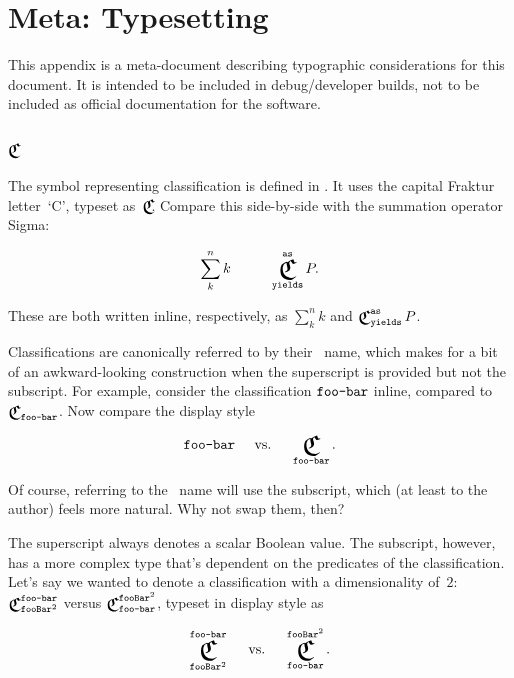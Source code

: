 
\section{Meta: Typesetting}
This appendix is a meta-document describing typographic considerations for
  this document.
It is intended to be included in debug/developer builds,
  not to be included as official documentation for the software.

\subsection{$\Classify$}
The symbol representing classification is defined in .
It uses the capital Fraktur letter~`C',
  typeset as~$\Classify\!\!$.
Compare this side-by-side with the summation operator Sigma:

\def\EXSUM{\sum_k^n k}
\def\EXCLASS{\Classify^\texttt{as}_\texttt{yields} P}

\begin{equation*}
 \EXSUM \mspace{50mu} \EXCLASS.
\end{equation*}

These are both written inline, respectively, as
  $\EXSUM$ and $\EXCLASS$.

Classifications are canonically referred to by their ~name,
  which makes for a bit of an awkward-looking construction when the
  superscript is provided but not the subscript.
For example, consider the classification $\texttt{foo-bar}$ inline,
  compared to~$\Classify_\texttt{foo-bar}$.
Now compare the display style

\begin{equation*}
  \tameclass{foo-bar}
  \mspace{25mu}\text{vs.}\mspace{25mu}
  \Classify_\texttt{foo-bar}.
\end{equation*}

Of course,
  referring to the ~name will use the subscript,
    which (at least to the author) feels more natural.
Why not swap them, then?

The superscript always denotes a scalar Boolean value.
The subscript,
  however,
  has a more complex type that's dependent on the predicates of the classification.
Let's say we wanted to denote a classification with a dimensionality of~$2$:
  $\Classify^\texttt{foo-bar}_{\texttt{fooBar}^2}$ versus
  $\Classify_\texttt{foo-bar}^{\texttt{fooBar}^2}$,
    typeset in display style as

\begin{equation*}
  \Classify^\texttt{foo-bar}_{\texttt{fooBar}^2}
  \mspace{25mu}\text{vs.}\mspace{25mu}
  \Classify_\texttt{foo-bar}^{\texttt{fooBar}^2}.
\end{equation*}

